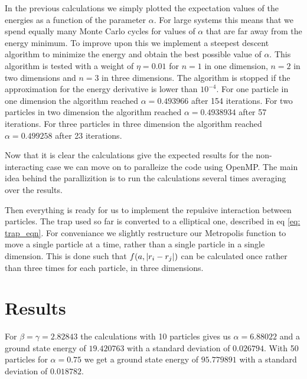 \documentclass[a4paper, 10pt, english]{revtex4-2} %
\begin{document}
    In the previous calculations we simply plotted the expectation values of the energies as a function of the parameter $\alpha$.
    For large systems this means that we spend equally many Monte Carlo cycles for values of $\alpha$ that are far away from the energy minimum.
    To improve upon this we implement a steepest descent algorithm to minimize the energy and obtain the best possible value of $\alpha$.
    This algorithm is tested with a weight of $\eta = 0.01$ for $n = 1$ in one dimension, $n = 2$ in two dimensions and $n = 3$ in three dimensions.
    The algorithm is stopped if the approximation for the energy derivative is lower than $10^{-4}$.
    For one particle in one dimension the algorithm reached $\alpha = 0.493966$ after 154 iterations.
    For two particles in two dimension the algorithm reached $\alpha = 0.4938934$ after 57 iterations.
    For three particles in three dimension the algorithm reached $\alpha = 0.499258$ after 23 iterations.

    Now that it is clear the calculations give the expected results for the non-interacting case we can move on to paralleize the code using OpenMP.
    The main idea behind the parallizition is to run the calculations several times averaging over the results.

    Then everything is ready for us to implement the repulsive interaction between particles.
    The trap used so far is converted to a elliptical one, described in eq \ref{eq: trap_eqn}.
    For conveniance we slightly restructure our Metropolis function to move a single particle at a time, rather than a single particle in a single dimension.
    This is done such that $f(a, \abs{r_i - r_j})$ can be calculated once rather than three times for each particle, in three dimensions. 


\section{\large Results}
    For $\beta = \gamma = 2.82843$ the calculations with 10 particles gives us $\alpha = 6.88022$ and a ground state energy of $19.420763$ with a standard deviation of $0.026794$.
    With 50 particles for $\alpha = 0.75$ we get a ground state energy of $95.779891$ with a standard deviation of $0.018782$.
\end{document}
